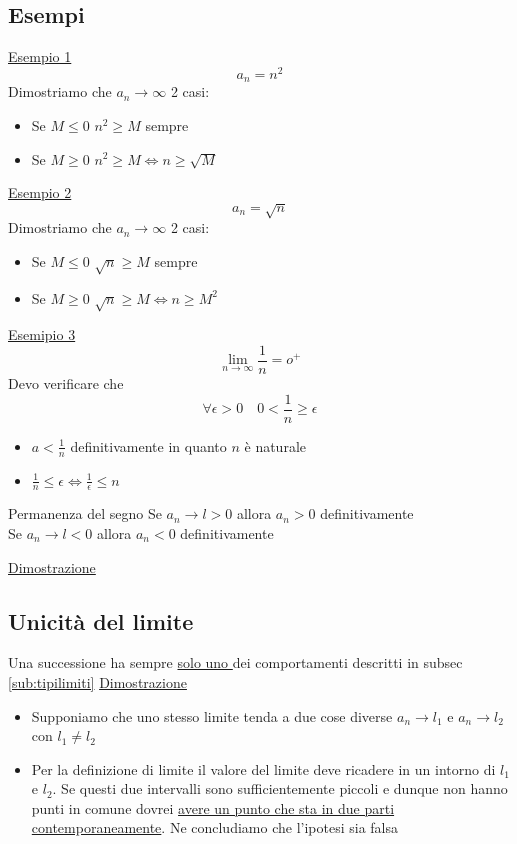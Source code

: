 \subsection{Esempi}
\underline{Esempio 1}
\[
	a_n = n^2
\]
Dimostriamo che $a_n \to \infty$
2 casi:
\begin{itemize}
	\item Se $M \le 0 $ \rarr $ n^2 \ge M$ sempre
	\item Se $M \ge 0 $ \rarr $n^2 \ge M \Leftrightarrow n \ge \sqrt{M} $
\end{itemize}
\underline{Esempio 2}
\[
	a_n = \sqrt{n}
\]
Dimostriamo che $a_n \to \infty$ 2 casi:
\begin{itemize}
	\item Se $M \le 0 $ \rarr $\sqrt{n} \ge M$ sempre
	\item Se $M \ge 0$ \rarr $\sqrt{n} \ge M \Leftrightarrow n \ge M^2$
\end{itemize}
\bigbox{
	\[
		\lim_{n \to \infty} n ^{a} = \infty \quad \forall a\ge 0
	\]
}
\underline{Esemipio 3}
\[
	\lim_{n \to \infty} \frac{1}{n} = o^{+}
\]
Devo verificare che \[
	\forall \epsilon > 0 \quad 0 < \frac{1}{n} \ge \epsilon
\]
\begin{itemize}
	\item $a < \frac{1}{n}$ definitivamente in quanto $n$ è naturale
	\item $\frac{1}{n} \le \epsilon \Leftrightarrow \frac{1}{\epsilon} \le n$
\end{itemize}
\bigbox{
	\[
		\lim_{n \to \infty}  n ^{\alpha} =0 \quad \forall \alpha \le 0
	\]
}

\begin{teorema}{Permanenza del segno}
	Se $a_n \to l > 0$ allora $a_n > 0 $ definitivamente\\
	Se $a_n \to l<0$ allora $a_n < 0 $ definitivamente
\end{teorema}
\underline{Dimostrazione}

\subsection{Unicità del limite}
Una successione ha sempre \underline{solo uno } dei comportamenti descritti in subsec \ref{sub:tipilimiti}
\underline{Dimostrazione}

\begin{itemize}
	\item Supponiamo che uno stesso limite tenda a due cose diverse $a_n \to l_1$ e $a_n \to l_2$ con $l_1 \neq l_2$
	\item Per la definizione di limite il valore del limite deve ricadere in un intorno di $l_1$ e $ l_2$. Se questi due intervalli sono sufficientemente piccoli e dunque non hanno punti in comune dovrei \underline{avere un punto che sta in due parti contemporaneamente}. Ne concludiamo che l'ipotesi sia falsa
\end{itemize}
